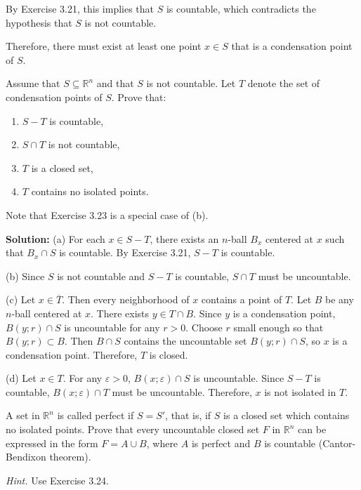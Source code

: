 By Exercise 3.21, this implies that $S$ is countable, which contradicts the hypothesis that $S$ is not countable.

Therefore, there must exist at least one point $x \in S$ that is a condensation point of $S$.

\begin{problembox}
Assume that \( S \subseteq \mathbb{R}^n \) and that \( S \) is not countable. Let \( T \) denote the set of condensation points of \( S \). Prove that:
\begin{enumerate}[label=\alph*)]
\item \( S - T \) is countable,
\item \( S \cap T \) is not countable,
\item \( T \) is a closed set,
\item \( T \) contains no isolated points.
\end{enumerate}
Note that Exercise 3.23 is a special case of (b).
\end{problembox}

\textbf{Solution:} 
(a) For each $x \in S - T$, there exists an $n$-ball $B_x$ centered at $x$ such that $B_x \cap S$ is countable. By Exercise 3.21, $S - T$ is countable.

(b) Since $S$ is not countable and $S - T$ is countable, $S \cap T$ must be uncountable.

(c) Let $x \in \overline{T}$. Then every neighborhood of $x$ contains a point of $T$. Let $B$ be any $n$-ball centered at $x$. There exists $y \in T \cap B$. Since $y$ is a condensation point, $B(y;r) \cap S$ is uncountable for any $r > 0$. Choose $r$ small enough so that $B(y;r) \subset B$. Then $B \cap S$ contains the uncountable set $B(y;r) \cap S$, so $x$ is a condensation point. Therefore, $T$ is closed.

(d) Let $x \in T$. For any $\varepsilon > 0$, $B(x;\varepsilon) \cap S$ is uncountable. Since $S - T$ is countable, $B(x;\varepsilon) \cap T$ must be uncountable. Therefore, $x$ is not isolated in $T$.

\begin{problembox}
A set in \( \mathbb{R}^n \) is called perfect if \( S = S' \), that is, if \( S \) is a closed set which contains no isolated points. Prove that every uncountable closed set \( F \) in \( \mathbb{R}^n \) can be expressed in the form \( F = A \cup B \), where \( A \) is perfect and \( B \) is countable (Cantor-Bendixon theorem).

\textit{Hint.} Use Exercise 3.24.
\end{problembox}

